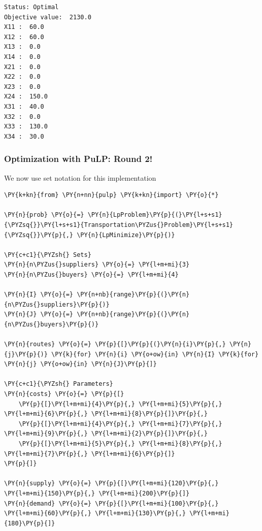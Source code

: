     \begin{Verbatim}[commandchars=\\\{\}]
Status: Optimal
Objective value:  2130.0
X11 :  60.0
X12 :  60.0
X13 :  0.0
X14 :  0.0
X21 :  0.0
X22 :  0.0
X23 :  0.0
X24 :  150.0
X31 :  40.0
X32 :  0.0
X33 :  130.0
X34 :  30.0
    \end{Verbatim}

    \hypertarget{optimization-with-pulp-round-2}{%
\subsubsection{Optimization with PuLP: Round
2!}\label{optimization-with-pulp-round-2}}

We now use set notation for this implementation

    \begin{tcolorbox}[breakable, size=fbox, boxrule=1pt, pad at break*=1mm,colback=cellbackground, colframe=cellborder]
\begin{Verbatim}[commandchars=\\\{\}]
\PY{k+kn}{from} \PY{n+nn}{pulp} \PY{k+kn}{import} \PY{o}{*}

\PY{n}{prob} \PY{o}{=} \PY{n}{LpProblem}\PY{p}{(}\PY{l+s+s1}{\PYZsq{}}\PY{l+s+s1}{Transportation\PYZus{}Problem}\PY{l+s+s1}{\PYZsq{}}\PY{p}{,} \PY{n}{LpMinimize}\PY{p}{)}

\PY{c+c1}{\PYZsh{} Sets}
\PY{n}{n\PYZus{}suppliers} \PY{o}{=} \PY{l+m+mi}{3}
\PY{n}{n\PYZus{}buyers} \PY{o}{=} \PY{l+m+mi}{4}

\PY{n}{I} \PY{o}{=} \PY{n+nb}{range}\PY{p}{(}\PY{n}{n\PYZus{}suppliers}\PY{p}{)}
\PY{n}{J} \PY{o}{=} \PY{n+nb}{range}\PY{p}{(}\PY{n}{n\PYZus{}buyers}\PY{p}{)}

\PY{n}{routes} \PY{o}{=} \PY{p}{[}\PY{p}{(}\PY{n}{i}\PY{p}{,} \PY{n}{j}\PY{p}{)} \PY{k}{for} \PY{n}{i} \PY{o+ow}{in} \PY{n}{I} \PY{k}{for} \PY{n}{j} \PY{o+ow}{in} \PY{n}{J}\PY{p}{]}

\PY{c+c1}{\PYZsh{} Parameters}
\PY{n}{costs} \PY{o}{=} \PY{p}{[}
    \PY{p}{[}\PY{l+m+mi}{4}\PY{p}{,} \PY{l+m+mi}{5}\PY{p}{,} \PY{l+m+mi}{6}\PY{p}{,} \PY{l+m+mi}{8}\PY{p}{]}\PY{p}{,}
    \PY{p}{[}\PY{l+m+mi}{4}\PY{p}{,} \PY{l+m+mi}{7}\PY{p}{,} \PY{l+m+mi}{9}\PY{p}{,} \PY{l+m+mi}{2}\PY{p}{]}\PY{p}{,} 
    \PY{p}{[}\PY{l+m+mi}{5}\PY{p}{,} \PY{l+m+mi}{8}\PY{p}{,} \PY{l+m+mi}{7}\PY{p}{,} \PY{l+m+mi}{6}\PY{p}{]}
\PY{p}{]}

\PY{n}{supply} \PY{o}{=} \PY{p}{[}\PY{l+m+mi}{120}\PY{p}{,} \PY{l+m+mi}{150}\PY{p}{,} \PY{l+m+mi}{200}\PY{p}{]}
\PY{n}{demand} \PY{o}{=} \PY{p}{[}\PY{l+m+mi}{100}\PY{p}{,} \PY{l+m+mi}{60}\PY{p}{,} \PY{l+m+mi}{130}\PY{p}{,} \PY{l+m+mi}{180}\PY{p}{]}


\end{Verbatim}
\end{tcolorbox}

